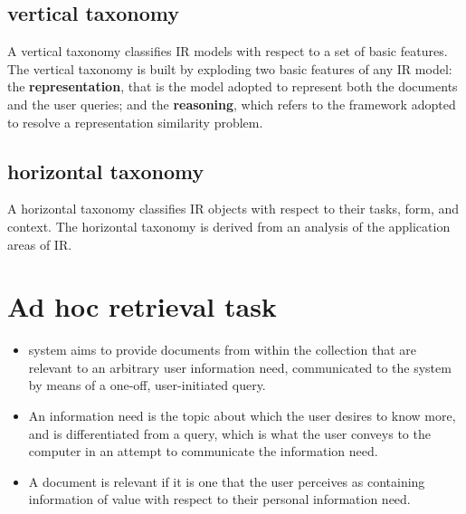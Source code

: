 \subsection{vertical taxonomy}

A vertical taxonomy classifies IR models with respect to a set of basic features.
The vertical taxonomy is built by exploding two basic features of any IR model: the \textbf{representation}, that is the model adopted to represent both the documents and the user queries; and the \textbf{reasoning}, which refers to the framework adopted to resolve a representation similarity problem. 

\subsection{horizontal taxonomy}

A horizontal taxonomy classifies IR objects with respect to their tasks, form, and context. 
The horizontal taxonomy is derived from an analysis of the application areas of IR.


\section{Ad hoc retrieval task}\label{ad hoc retrieval task}
\begin{itemize}
    \item system aims to provide documents from within the collection that are relevant to an arbitrary user information need, communicated to the system by means of a one-off, user-initiated query. 
    
    \item An information need is the topic about which the user desires to know more, and is differentiated from a query, which is what the user conveys to the computer in an attempt to communicate the information need.

    \item A document is relevant if it is one that the user perceives as containing information of value with respect to their personal information need.
\end{itemize}








































